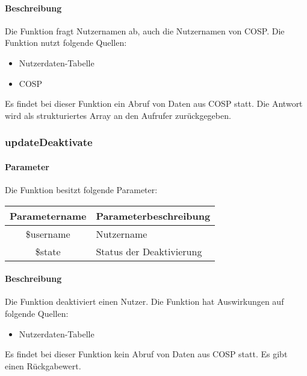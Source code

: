 \paragraph{Beschreibung} Die Funktion fragt Nutzernamen ab, auch die Nutzernamen von {\glqq COSP\grqq}. Die Funktion nutzt folgende Quellen:
\begin{itemize}
	\item Nutzerdaten-Tabelle
	\item COSP
\end{itemize}
Es findet bei dieser Funktion ein Abruf von Daten aus {\glqq COSP\grqq} statt. Die Antwort wird als strukturiertes Array an den Aufrufer zurückgegeben.
\subsubsection{updateDeaktivate}
\paragraph{Parameter} Die Funktion besitzt folgende Parameter:
\begin{table}[H]
	\begin{tabular}{|c|p{11cm}|}
		\hline
		\textbf{Parametername} & \textbf{Parameterbeschreibung} \\ \hline
		\$username      & Nutzername \\ \hline
		\$state         & Status der Deaktivierung \\ \hline
	\end{tabular}
\end{table}
\paragraph{Beschreibung} Die Funktion deaktiviert einen Nutzer. Die Funktion hat Auswirkungen auf folgende Quellen:
\begin{itemize}
	\item Nutzerdaten-Tabelle
\end{itemize}
Es findet bei dieser Funktion kein Abruf von Daten aus {\glqq COSP\grqq} statt. Es gibt einen Rückgabewert.